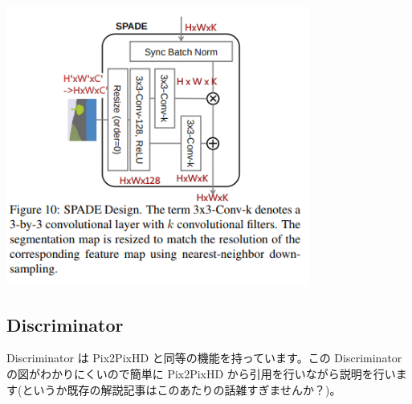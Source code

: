 \documentclass[a4paper, dvipdfmx, 10pt]{article}
\begin{document}
\begin{center}
\includegraphics[width=10cm]{./spade.png}
\end{center}

\subsection{Discriminator}
\label{sec:orgace7975}
Discriminator は Pix2PixHD と同等の機能を持っています。この Discriminator の図がわかりにくいので簡単に Pix2PixHD から引用を行いながら説明を行います(というか既存の解説記事はこのあたりの話雑すぎませんか？)。\\
\end{document}
